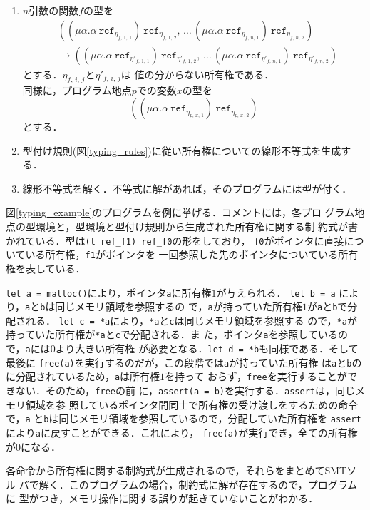 \begin{enumerate}
  \item $n$引数の関数$f$の型を
        \begin{align*}
          & ((\mu\alpha.\alpha\ \texttt{ref}_{\eta_{f,\,1,\,1}})
          \ \texttt{ref}_{\eta_{f,\,1,\,2}},\,\dots\,
          (\mu\alpha.\alpha\ \texttt{ref}_{\eta_{f,\,n,\,1}})
          \ \texttt{ref}_{\eta_{f,\,n,\,2}}) \\[-3pt]
              & \longrightarrow ((\mu\alpha.\alpha
          \ \texttt{ref}_{\eta'_{f,\,1,\,1}})
          \ \texttt{ref}_{\eta'_{f,\,1,\,2}},\,\dots\,
              (\mu\alpha.\alpha\ \texttt{ref}_{\eta'_{f,\,n,\,1}})
          \ \texttt{ref}_{\eta'_{f,\,n,\,2}})
        \end{align*}
        とする．$\eta_{f,\,i,\,j}$と$\eta'_{f,\,i,\,j}$は
        値の分からない所有権である．\\
        同様に，プログラム地点$p$での変数$x$の型を
        \[
        ((\mu\alpha.\alpha\ \texttt{ref}_{\eta_{p,\,x,\,1}})
        \ \texttt{ref}_{\eta_{p,\,x\,,2}})
        \]
        とする．
  \item 型付け規則(図\ref{typing_rules})に従い所有権についての線形不等式を生成する．
  \item 線形不等式を解く．不等式に解があれば，そのプログラムには型が付く．
\end{enumerate}


\begin{example}[型推論]
  図\ref{typing_example}のプログラムを例に挙げる．コメントには，各プロ
  グラム地点の型環境と，型環境と型付け規則から生成された所有権に関する制
  約式が書かれている．型は\verb|(t ref_f1) ref_f0|の形をしており，
  \texttt{f0}がポインタに直接についている所有権，\texttt{f1}がポインタを
  一回参照した先のポインタについている所有権を表している．

  \verb|let a = malloc()|により，ポインタ\verb|a|に所有権$1$が与えられる．
  \verb|let b = a| により，\verb|a|と\verb|b|は同じメモリ領域を参照するの
  で，\verb|a|が持っていた所有権$1$が\verb|a|と\verb|b|で分配される．
  \verb|let c = *a|により，\verb|*a|と\verb|c|は同じメモリ領域を参照する
  ので，\verb|*a|が持っていた所有権が\verb|*a|と\verb|c|で分配される．ま
  た，ポインタ\verb|a|を参照しているので，\verb|a|には$0$より大きい所有権
  が必要となる．\verb|let d = *b|も同様である．そして最後に
  \verb|free(a)|を実行するのだが，この段階では\verb|a|が持っていた所有権
  は\verb|a|と\verb|b|のに分配されているため，\verb|a|は所有権$1$を持って
  おらず，\verb|free|を実行することができない．そのため，\verb|free|の前
  に，\verb|assert(a = b)|を実行する．\verb|assert|は，同じメモリ領域を参
  照しているポインタ間同士で所有権の受け渡しをするための命令で，\verb|a|
  と\verb|b|は同じメモリ領域を参照しているので，分配していた所有権を
  \verb|assert|により\verb|a|に戻すことができる．これにより，
  \verb|free(a)|が実行でき，全ての所有権が$0$になる．

  各命令から所有権に関する制約式が生成されるので，それらをまとめてSMTソル
  バで解く．このプログラムの場合，制約式に解が存在するので，プログラムに
  型がつき，メモリ操作に関する誤りが起きていないことがわかる．
\end{example}

